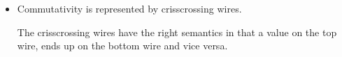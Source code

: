 \documentclass[preprint]{sigplanconf}
\begin{document}
{\begin{itemize}
\item Commutativity is represented by crisscrossing wires.
\begin{multicols}{2}
\begin{center}
\end{center}
\begin{center}
\end{center}
\end{multicols}

The crisscrossing wires have the right semantics in that a value on
the top wire, ends up on the bottom wire and vice versa.


\end{itemize}}
\end{document}

